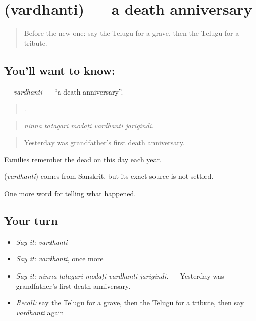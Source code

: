 \section[\texorpdfstring{\te{వర్ధంతి} (vardhanti)}{వర్ధంతి (vardhanti)}]{ (vardhanti) — a death anniversary}

\label{lesson:TE-C345-vardhanti}



\begin{quote}
Before the new one: say the Telugu for a grave, then the Telugu for a tribute.
\end{quote}

\subsection*{You'll want to know: }
\textbf{} — \emph{vardhanti} — \textquotedblleft{}a death anniversary\textquotedblright{}.

\begin{quote}
    .
\end{quote}

\begin{quote}
\emph{ninna tātagāri modaṭi vardhanti jarigindi.}
\end{quote}

\begin{quote}
Yesterday was grandfather's first death anniversary.
\end{quote}

Families remember the dead on this day each year.

\begin{cousinweb}
\textbf{} (\emph{vardhanti}) comes from Sanskrit, but its exact source is not settled.
\end{cousinweb}

\begin{grammarlens}[title={What you've built}]
One more word for telling what happened.
\end{grammarlens}

\subsection*{Your turn}
\begin{itemize}
\raggedright
  \item \emph{Say it:} \emph{vardhanti}
  \item \emph{Say it:} \emph{vardhanti}, once more
  \item \emph{Say it:} \emph{ninna tātagāri modaṭi vardhanti jarigindi.} — Yesterday was grandfather's first death anniversary.
  \item \emph{Recall:} say the Telugu for a grave, then the Telugu for a tribute, then say \emph{vardhanti} again
\end{itemize}

